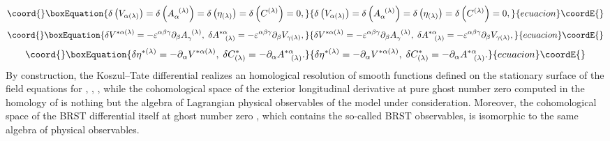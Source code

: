 \documentclass[a4paper,11pt]{article}
\begin{document}
\begin{equation}\coord{}\boxEquation{
\delta \left( V_{\alpha (\lambda )}\right) =\delta \left( A_{\alpha
}^{\;\;(\lambda )}\right) =\delta \left( \eta _{(\lambda )}\right) =\delta
\left( C^{(\lambda )}\right) =0,  \label{bf45}
}{
\delta \left( V_{\alpha (\lambda )}\right) =\delta \left( A_{\alpha
}^{\;\;(\lambda )}\right) =\delta \left( \eta _{(\lambda )}\right) =\delta
\left( C^{(\lambda )}\right) =0,  }{ecuacion}\coordE{}\end{equation}
\begin{equation}\coord{}\boxEquation{
\delta V^{*\alpha (\lambda )}=-\varepsilon ^{\alpha \beta \gamma }\partial
_{\beta }A_{\gamma }^{\;\;(\lambda )},\;\delta A_{\;\;\;(\lambda )}^{*\alpha
}=-\varepsilon ^{\alpha \beta \gamma }\partial _{\beta }V_{\gamma (\lambda
)},  \label{bf46}
}{
\delta V^{*\alpha (\lambda )}=-\varepsilon ^{\alpha \beta \gamma }\partial
_{\beta }A_{\gamma }^{\;\;(\lambda )},\;\delta A_{\;\;\;(\lambda )}^{*\alpha
}=-\varepsilon ^{\alpha \beta \gamma }\partial _{\beta }V_{\gamma (\lambda
)},  }{ecuacion}\coordE{}\end{equation}
\begin{equation}\coord{}\boxEquation{
\delta \eta ^{*(\lambda )}=-\partial _{\alpha }V^{*\alpha (\lambda
)},\;\delta C_{(\lambda )}^{*}=-\partial _{\alpha }A_{\;\;\;(\lambda
)}^{*\alpha }.  \label{bf47}
}{
\delta \eta ^{*(\lambda )}=-\partial _{\alpha }V^{*\alpha (\lambda
)},\;\delta C_{(\lambda )}^{*}=-\partial _{\alpha }A_{\;\;\;(\lambda
)}^{*\alpha }.  }{ecuacion}\coordE{}\end{equation}
By construction, the Koszul--Tate differential realizes an homological
resolution of smooth functions defined on the stationary surface of the
field equations for \coordHE{}, \coordHE{}, \coordHE{}, while the cohomological space of the exterior longitudinal
derivative at pure ghost number zero computed in the homology of \myHighlight{$\delta $}\coordHE{}
is nothing but the algebra of Lagrangian physical observables of the model
under consideration. Moreover, the cohomological space of the BRST
differential itself at ghost number zero \coordHE{}, which
contains the so-called BRST observables, is isomorphic to the same algebra
of physical observables.
\end{document}
